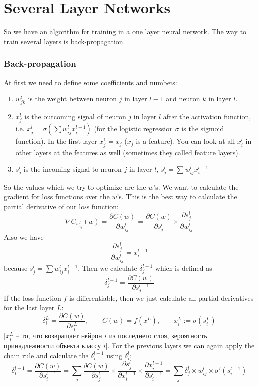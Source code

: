 \section{Several Layer Networks}

So we have an algorithm for training in a one layer neural network. The way to train several layers is back-propagation. 

\subsubsection*{Back-propagation}

At first we need to define some coefficients and numbers:
\begin{enumerate}[label=$\bullet$]
  \item $w_{jk}^l$ is the weight between neuron $j$ in layer $l-1$ and neuron $k$ in layer $l$.
  \item $x_j^l$ is the outcoming signal of neuron $j$ in layer $l$ after the activation function, i.e. $x_j^l=\sigma\left(\sum w_{ij}^lx_i^{l-1}\right)$ (for the logistic regression $\sigma$ is the sigmoid function). In the first layer $x_j^1=x_j$ ($x_j$ is a feature). You can look at all $x_i^l$ in other layers at the features as well (sometimes they called feature layers).
  \item $s_j^l$ is the incoming signal to neuron $j$ in layer $l$, $s_j^l=\sum w_{ij}^lx_i^{l-1}$
\end{enumerate}
So the values which we try to optimize are the $w$'s. We want to calculate the gradient for loss functions over the $w$'s. This is the best way to calculate the partial derivative of our loss function:
$$\nabla C_{w_{ij}^l}(w)=\frac{\partial C(w)}{\partial w_{ij}^l}=\frac{\partial C(w)}{\partial s_j^l}\times\frac{\partial s_j^l}{\partial w_{ij}^l}$$
Also we have
$$\frac{\partial s_j^l}{\partial w_{ij}^l}=x_i^{l-1}$$
because $s_j^l=\sum w_{ij}^lx_i^{l-1}$. Then we calculate $\delta_j^{l-1}$ which is defined as
$$\delta_j^{l-1}=\frac{\partial C(w)}{\partial s_j^{l-1}}$$
If the loss function $f$ is differentiable, then we just calculate all partial derivatives for the last layer $L$:
$$\delta_i^L=\frac{\partial C(w)}{\partial s_i^L},\qquad C(w)=f(x^L),\qquad x_i^L:=\sigma(s_i^L)$$
[$x_i^L$ -- то, что возвращает нейрон $i$ из последнего слоя, вероятность принадлежности объекта классу $i$]. For the previous layers we can again apply the chain rule and calculate the $\delta_i^{l-1}$ using $\delta_i^l$:
$$\delta_i^{l-1}=\frac{\partial C(w)}{\partial s_i^{l-1}}=\sum\limits_{j}\frac{\partial C(w)}{\partial s_j^l}\times\frac{\partial s_j^l}{\partial x_i^{l-1}}\times\frac{\partial x_i^{l-1}}{\partial s_i^{l-1}}=\sum\limits_{j}\delta_j^l\times w_{ij}^l\times\sigma'(s_i^{l-1})$$
